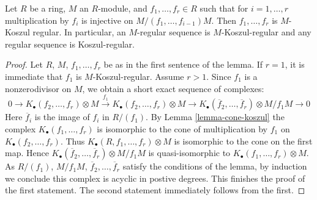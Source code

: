 \begin{lemma}
\label{lemma-regular-koszul-regular}
Let $R$ be a ring, $M$ an $R$-module, and $f_1, \ldots, f_r \in R$
such that for $i = 1, \ldots, r$ multiplication by $f_i$
is injective on $M/(f_1, \ldots, f_{i - 1})M$. Then $f_1, \ldots, f_r$
is $M$-Koszul regular. In particular, an $M$-regular sequence
is $M$-Koszul-regular and any regular sequence is Koszul-regular.
\end{lemma}

\begin{proof}
Let $R$, $M$, $f_1, \ldots, f_r$ be as in the first sentence of the lemma.
If $r = 1$, it is immediate that $f_1$ is $M$-Koszul-regular.
Assume $r > 1$. Since $f_1$ is a nonzerodivisor on $M$, we obtain
a short exact sequence of complexes:
$$
0 \to K_\bullet(f_2, \ldots, f_r) \otimes M
\xrightarrow{f_1}
K_\bullet(f_2, \ldots, f_r) \otimes M \to
K_\bullet(\overline{f}_2, \ldots, \overline{f}_r) \otimes M/f_1M \to 0
$$
Here $\overline{f}_i$ is the image of $f_i$ in $R/(f_1)$. By
Lemma \ref{lemma-cone-koszul}
the complex $K_\bullet(f_1, \ldots, f_r)$
is isomorphic to the cone of multiplication by $f_1$
on $K_\bullet(f_2, \ldots, f_r)$. Thus
$K_\bullet(R, f_1, \ldots, f_r) \otimes M$ is isomorphic
to the cone on the first map. Hence
$K_\bullet(\overline{f}_2, \ldots, \overline{f}_r) \otimes M/f_1M$
is quasi-isomorphic to $K_\bullet(f_1, \ldots, f_r) \otimes M$.
As $R/(f_1)$, $M/f_1M$, $\overline{f}_2, \ldots, \overline{f}_r$
satisfy the conditions of the lemma, by induction we conclude
this complex is acyclic in postive degrees. This finishes the proof
of the first statement. The second statement immediately follows
from the first.
\end{proof}
